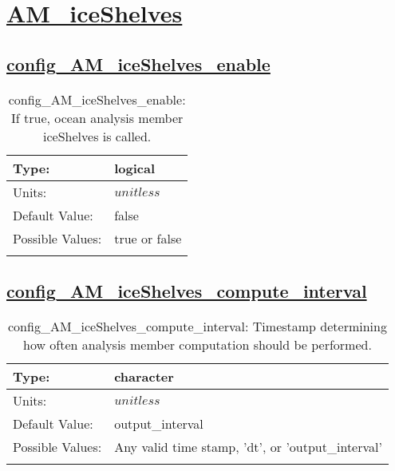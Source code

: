 \section[AM\_iceShelves]{\hyperref[sec:nm_tab_AM_iceShelves]{AM\_iceShelves}}
\label{sec:nm_sec_AM_iceShelves}
\subsection[config\_AM\_iceShelves\_enable]{\hyperref[sec:nm_tab_AM_iceShelves]{config\_AM\_iceShelves\_enable}}
\label{subsec:nm_sec_config_AM_iceShelves_enable}
\begin{center}
\begin{longtable}{| p{2.0in} || p{4.0in} |}
    \hline
    Type: & logical \\
    \hline
    Units: & $unitless$ \\
    \hline
    Default Value: & false \\
    \hline
    Possible Values: & true or false \\
    \hline
    \caption{config\_AM\_iceShelves\_enable: If true, ocean analysis member iceShelves is called.}
\end{longtable}
\end{center}
\subsection[config\_AM\_iceShelves\_compute\_interval]{\hyperref[sec:nm_tab_AM_iceShelves]{config\_AM\_iceShelves\_compute\_interval}}
\label{subsec:nm_sec_config_AM_iceShelves_compute_interval}
\begin{center}
\begin{longtable}{| p{2.0in} || p{4.0in} |}
    \hline
    Type: & character \\
    \hline
    Units: & $unitless$ \\
    \hline
    Default Value: & output\_interval \\
    \hline
    Possible Values: & Any valid time stamp, 'dt', or 'output\_interval' \\
    \hline
    \caption{config\_AM\_iceShelves\_compute\_interval: Timestamp determining how often analysis member computation should be performed.}
\end{longtable}
\end{center}
